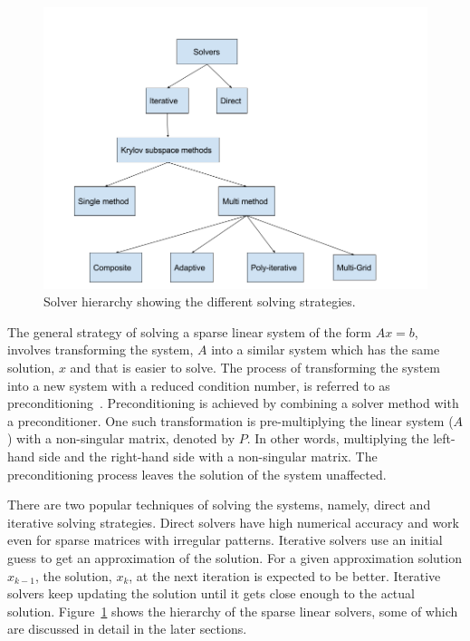 \begin{figure}
\begin{center}
 \includegraphics[width=0.95\linewidth]{figures/solver.png}
\end{center}
 \caption{Solver hierarchy showing the different solving strategies.}
 \label{fig:solver}
\end{figure}

The general strategy of solving a sparse linear system of the form $Ax = b$, 
involves transforming the system, $A$ into a similar system which has the same solution, $x$ 
and that is easier to solve. The process of transforming the system into a new system with a reduced condition number, is referred to as preconditioning~\cite{misc3}. Preconditioning is achieved by combining a solver method with a preconditioner. One such transformation 
is pre-multiplying the linear system ($A$) with a non-singular matrix, denoted by $P$. In other words, multiplying 
the left-hand side and the right-hand side with a non-singular matrix. The preconditioning process leaves the solution of the system unaffected. 

There are two popular techniques of solving the systems, namely, direct and iterative solving strategies. Direct solvers have high numerical accuracy and work even for sparse matrices with irregular patterns. Iterative solvers use an initial guess to get an approximation of the solution. For a given approximation solution $x_{k-1}$, the solution, $x_{k}$, at the next iteration is expected to be better. Iterative solvers keep updating the solution until it gets close enough to the actual solution. Figure~\ref{fig:solver} shows the hierarchy of the sparse linear solvers, some of which are discussed in detail in the later sections.

